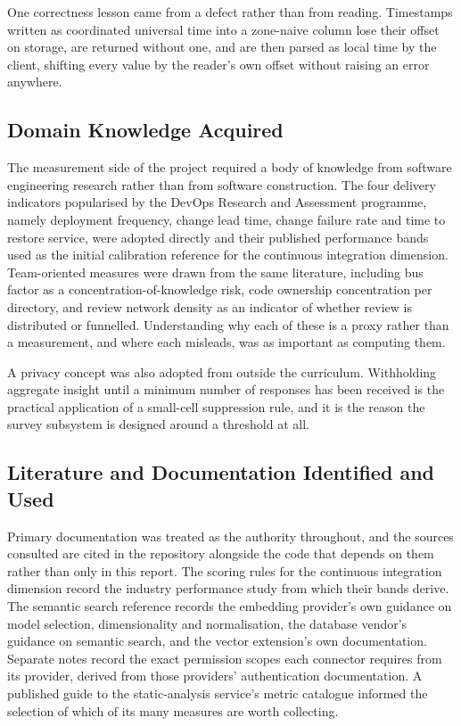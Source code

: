 One correctness lesson came from a defect rather than from reading. Timestamps
written as coordinated universal time into a zone-naive column lose their offset
on storage, are returned without one, and are then parsed as local time by the
client, shifting every value by the reader's own offset without raising an error
anywhere.

\subsection{Domain Knowledge Acquired}
\label{subsec:domain-learned}

The measurement side of the project required a body of knowledge from software
engineering research rather than from software construction. The four delivery
indicators popularised by the DevOps Research and Assessment programme, namely
deployment frequency, change lead time, change failure rate and time to restore
service, were adopted directly and their published performance bands used as the
initial calibration reference for the continuous integration dimension.
Team-oriented measures were drawn from the same literature, including bus factor
as a concentration-of-knowledge risk, code ownership concentration per directory,
and review network density as an indicator of whether review is distributed or
funnelled. Understanding why each of these is a proxy rather than a measurement,
and where each misleads, was as important as computing them.

A privacy concept was also adopted from outside the curriculum. Withholding
aggregate insight until a minimum number of responses has been received is the
practical application of a small-cell suppression rule, and it is the reason the
survey subsystem is designed around a threshold at all.

\subsection{Literature and Documentation Identified and Used}
\label{subsec:literature-used}

Primary documentation was treated as the authority throughout, and the sources
consulted are cited in the repository alongside the code that depends on them
rather than only in this report. The scoring rules for the continuous integration
dimension record the industry performance study from which their bands derive. The
semantic search reference records the embedding provider's own guidance on model
selection, dimensionality and normalisation, the database vendor's guidance on
semantic search, and the vector extension's own documentation. Separate notes
record the exact permission scopes each connector requires from its provider,
derived from those providers' authentication documentation. A published guide to
the static-analysis service's metric catalogue informed the selection of which of
its many measures are worth collecting.

